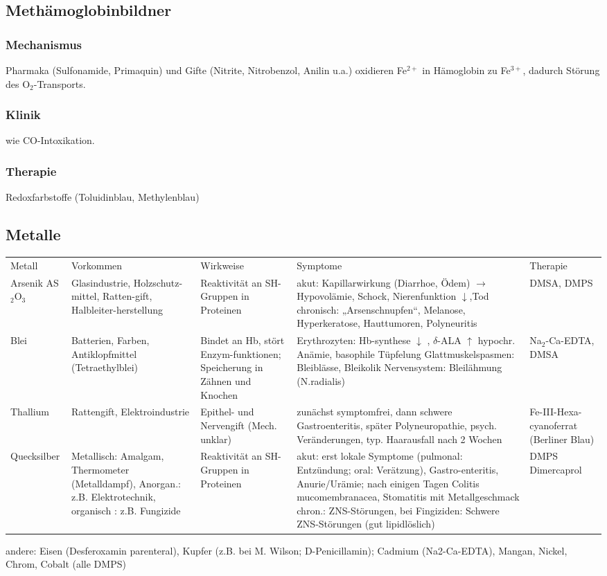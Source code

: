 \documentclass[10pt,a4paper]{report}
\begin{document}
\subsection{Methämoglobinbildner} %
\label{sub:meth_moglobinbildner}
\subsubsection{Mechanismus} %
\label{ssub:mechanismus}
Pharmaka (Sulfonamide, Primaquin) und Gifte (Nitrite, Nitrobenzol, Anilin u.a.) oxidieren Fe$^{2+}$ in Hämoglobin zu Fe$^{3+}$, dadurch Störung des O$_2$-Transports.
\subsubsection{Klinik} %
\label{ssub:klinik}
wie CO-Intoxikation.
\subsubsection{Therapie} %
\label{ssub:therapie}
Redoxfarbstoffe (Toluidinblau, Methylenblau)
\subsection{Metalle} %
\label{sub:metalle}
\begin{tabularx}{\textwidth}{lXXXX}
Metall&Vorkommen&Wirkweise&Symptome&Therapie\\
Arsenik AS$_2$O$_3$&Glasindustrie, Holzschutz-mittel, Ratten-gift, Halbleiter-herstellung&Reaktivität an SH-Gruppen in Proteinen&akut: Kapillarwirkung (Diarrhoe, Ödem) $\rightarrow$ Hypovolämie, Schock, Nierenfunktion $\downarrow$,Tod chronisch: „Arsenschnupfen“, Melanose, Hyperkeratose, Hauttumoren, Polyneuritis&DMSA, DMPS\\
Blei&Batterien, Farben, Antiklopfmittel (Tetraethylblei)&Bindet an Hb, stört Enzym-funktionen; Speicherung in Zähnen und Knochen&Erythrozyten: Hb-synthese $\downarrow$ , $\delta$-ALA $\uparrow$    hypochr. Anämie, basophile Tüpfelung Glattmuskelspasmen: Bleiblässe, Bleikolik Nervensystem: Bleilähmung (N.radialis)&Na$_2$-Ca-EDTA, DMSA\\
Thallium&Rattengift, Elektroindustrie&Epithel- und Nervengift (Mech. unklar)&zunächst symptomfrei, dann schwere Gastroenteritis, später Polyneuropathie, psych. Veränderungen, typ. Haarausfall nach 2 Wochen&Fe-III-Hexa-cyanoferrat (Berliner Blau)\\
Quecksilber&Metallisch: Amalgam, Thermometer (Metalldampf), Anorgan.: z.B. Elektrotechnik, organisch : z.B. Fungizide&Reaktivität an SH-Gruppen in Proteinen&akut: erst lokale Symptome (pulmonal: Entzündung; oral: Verätzung), Gastro-enteritis, Anurie/Urämie; nach einigen Tagen Colitis mucomembranacea, Stomatitis mit Metallgeschmack chron.: ZNS-Störungen, bei Fingiziden: Schwere ZNS-Störungen (gut lipidlöslich)&DMPS Dimercaprol\\
\end{tabularx}
andere: Eisen (Desferoxamin parenteral), Kupfer (z.B. bei M. Wilson; D-Penicillamin); Cadmium (Na2-Ca-EDTA), Mangan, Nickel, Chrom, Cobalt (alle DMPS) 
\end{document}
